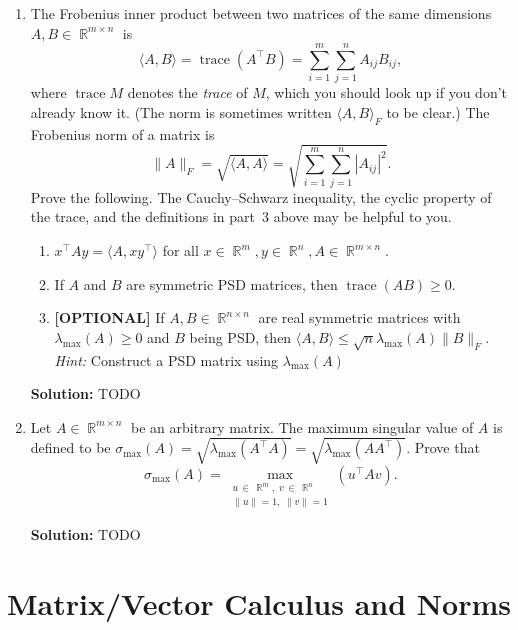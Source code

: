 \documentclass{article}
\newcommand{\Question}[1]{\Large \section{ #1 } \normalsize}
\DeclareMathOperator{\trac}{\mathrm{trace}}
\DeclareMathOperator{\R}{\mathbb{R}}
\newenvironment{solution}{\color{blue} \smallskip \textbf{Solution:}}{}
\begin{document}
\begin{enumerate}
    \item 
    The Frobenius inner product between two matrices of the same dimensions $A,B \in \R^{m \times n}$ is
    \[
        \langle A, B \rangle = \trac(A^\top B) = \sum_{i=1}^m \sum_{j=1}^n A_{ij} B_{ij},
    \]
    where $\trac M$ denotes the {\em trace} of $M$, which you should look up if you don't already know it.
    (The norm is sometimes written $\langle A, B \rangle_F$ to be clear.)
    The Frobenius norm of a matrix is
    \[
        \|A\|_F = \sqrt{\langle A, A \rangle} = \sqrt{\sum_{i=1}^m \sum_{j=1}^n |A_{ij}|^2}.
    \]
    Prove the following.
    The Cauchy--Schwarz inequality, the cyclic property of the trace, and the definitions in part~3 above may be helpful to you.
    \begin{enumerate}
        \item 
        $x^\top A y = \langle A, x y^\top \rangle$ for all $x \in \R^{m}, y \in \R^{n}, A \in \R^{m \times n}$.
        \item 
        If $A$ and $B$ are symmetric PSD matrices, then $\trac(AB)\geq 0$.
        \item 
        \textbf{[OPTIONAL]} If $A,B \in \R^{n \times n}$ are real symmetric matrices with $\lambda_{\max}(A) \geq 0$ and $B$ being PSD, then $\langle A, B \rangle \leq \sqrt n \lambda_{\max}(A) \|B\|_F$. \\
        \emph{Hint:} Construct a PSD matrix using $\lambda_{\max}(A)$
    \end{enumerate}
    
    \begin{solution}
        TODO
    \end{solution}

    \item 
    Let $A\in\R^{m \times n}$ be an arbitrary matrix. 
    The maximum singular value of $A$ is defined to be $\sigma_{\max}(A) = \sqrt{\lambda_{\max}(A^\top A)} = \sqrt{\lambda_{\max}(A A^\top)}$. Prove that
    \[
        \sigma_{\max}(A) = \max_{\substack{u \,\in\, \R^{m},\; v \,\in\, \R^n \\ \|u\|=1,\; \|v\|=1}}(u^\top A v).
    \]
    
    \begin{solution}
        TODO
    \end{solution}

\end{enumerate}

\newpage
\Question{Matrix/Vector Calculus and Norms}
\end{document}
